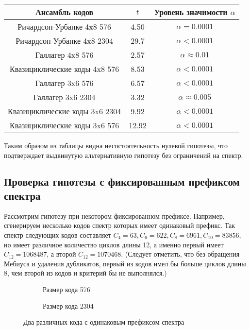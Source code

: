 \begin{tabular}{|c|c|c|}
	\hline
	Ансамбль кодов & $t$ & Уровень значимости $\alpha$\\
	\hline
	Ричардсон-Урбанке 4x8 576 & 4.50 &  $\alpha = 0.0001$\\
	\hline
	Ричардсон-Урбанке 4x8 2304 & 29.7 & $\alpha < 0.0001$ \\
	\hline
	Галлагер 4x8 576 & 2.57 & $\alpha \approx 0.01$ \\
	\hline
	Квазициклические коды 4x8 576 & 8.53 & $\alpha < 0.0001$ \\
	\hline
	Галлагер 3x6 576 & 6.57 & $\alpha < 0.0001$ \\
	\hline
	Галлагер 3x6 2304 & 3.32 & $\alpha \approx 0.005$ \\
	\hline
	Квазициклические коды 3x6 2304 & 9.92 & $\alpha < 0.0001$ \\
	\hline
	Квазициклические коды 3x6 576 & 12.92 & $\alpha < 0.0001$ \\
	\hline
\end{tabular}

Таким образом из таблицы видна несостоятельность нулевой гипотезы, что подтверждает выдвинутую альтернативную
гипотезу без ограничений на спектр.

\subsection{Проверка гипотезы с фиксированным префиксом спектра}

Рассмотрим гипотезу при некотором фиксированном префиксе. Например, сгенерируем несколько кодов
спектр которых имеет одинаковый префикс. Так спектр следующих кодов составляет 
$C_4=63, C_6=622, C_8=6961, C_{10}=83856$, но имеет различное количество циклов
длины 12, а именно первый имеет $C_{12}=1068487$, а второй $C_{12}=1070468$.  (Следует отметить, что без обращения Мебиуса и удаления дубликатов, первый из кодов имел бы больше
циклов длины 8, чем второй из кодов и критерий бы не выполнялся.)

\begin{figure}[h!]
\centering
\begin{subfigure}{.5\textwidth}
  \centering
  \caption{Размер кода 576}
\end{subfigure}%
\begin{subfigure}{.5\textwidth}
  \centering
  \caption{Размер кода 2304}
\end{subfigure}
\caption{Два различных кода с одинаковым префиксом спектра}
\end{figure}

